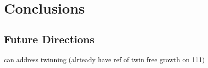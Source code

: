 \chapter{Conclusions}
\section{Future Directions}
can address twinning (alrteady have ref of twin free growth on 111)